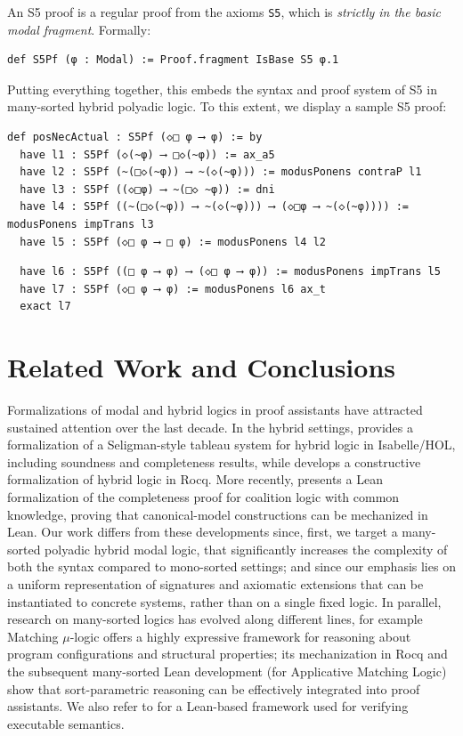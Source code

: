 \documentclass{easychair}
\theoremstyle{remark}
\begin{document}
An S5 proof is a regular proof from the axioms \lstinline{S5}, which is \textit{strictly in the basic modal fragment}. Formally:

\begin{lstlisting}
def S5Pf (φ : Modal) := Proof.fragment IsBase S5 φ.1
\end{lstlisting}

Putting everything together, this embeds the syntax and proof system of S5 in many-sorted hybrid polyadic logic. To this extent, we display a sample S5 proof:
\begin{lstlisting}
def posNecActual : S5Pf (◇□ φ ⟶ φ) := by
  have l1 : S5Pf (◇(~φ) ⟶ □◇(~φ)) := ax_a5
  have l2 : S5Pf (~(□◇(~φ)) ⟶ ~(◇(~φ))) := modusPonens contraP l1
  have l3 : S5Pf ((◇□φ) ⟶ ~(□◇ ~φ)) := dni
  have l4 : S5Pf ((~(□◇(~φ)) ⟶ ~(◇(~φ))) ⟶ (◇□φ ⟶ ~(◇(~φ)))) := modusPonens impTrans l3
  have l5 : S5Pf (◇□ φ ⟶ □ φ) := modusPonens l4 l2
\end{lstlisting}
\vspace{-1.25em}
\begin{lstlisting}
  have l6 : S5Pf ((□ φ ⟶ φ) ⟶ (◇□ φ ⟶ φ)) := modusPonens impTrans l5
  have l7 : S5Pf (◇□ φ ⟶ φ) := modusPonens l6 ax_t
  exact l7
\end{lstlisting}

\section{Related Work and Conclusions}\label{related}

Formalizations of modal and hybrid logics in proof assistants have attracted sustained attention over the last decade. In the hybrid settings, \cite{hybridisabelle} provides a formalization of a Seligman-style tableau system for hybrid logic in Isabelle/HOL, including soundness and completeness results, while \cite{hybridcoq} develops a constructive formalization of hybrid logic in Rocq. More recently, \cite{itpagents24} presents a Lean formalization of the completeness proof for coalition logic with common knowledge, proving that canonical-model constructions can be mechanized in Lean. Our work differs from these developments since, first, we target a many-sorted polyadic hybrid modal logic, that significantly increases the complexity of both the syntax compared to mono-sorted settings; and since our emphasis lies on a uniform representation of signatures and axiomatic extensions that can be instantiated to concrete systems, rather than on a single fixed logic. In parallel, research on many-sorted logics has evolved along different lines, for example Matching $\mu$-logic \cite{matching} offers a highly expressive framework for reasoning about program configurations and structural properties; its mechanization in Rocq \cite{matchingcoq} and the subsequent many-sorted Lean development \cite{matchinglean} (for Applicative Matching Logic) show that sort-parametric reasoning can be effectively integrated into proof assistants. We also refer to \cite{loom} for a Lean-based framework used for  verifying executable semantics. 
\end{document}
